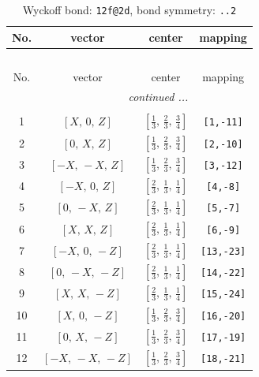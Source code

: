 \documentclass[fleqn,8pt]{jsarticle}
\begin{document}
\renewcommand{\arraystretch}{1.2}
\begin{longtable}{cccc}
\caption{Wyckoff bond: {\tt 12f@2d}, bond symmetry: {\tt ..2}}
 \\
 \hline \hline
No. & vector & center & mapping \\ \hline \endfirsthead

\multicolumn{3}{l}{\tablename\ \thetable{}} \\
 \hline \hline
No. & vector & center & mapping \\ \hline \endhead

 \hline \hline
\multicolumn{3}{r}{\footnotesize\it continued ...} \\ \endfoot

 \hline \hline
\multicolumn{3}{r}{} \\ \endlastfoot

1 & $\left[ X,\, 0,\, Z \right]$ & $\left[ \frac{1}{3},\, \frac{2}{3},\, \frac{3}{4} \right]$ & {\tt [1,-11]} \\ \hline
2 & $\left[ 0,\, X,\, Z \right]$ & $\left[ \frac{1}{3},\, \frac{2}{3},\, \frac{3}{4} \right]$ & {\tt [2,-10]} \\ \hline
3 & $\left[ - X,\, - X,\, Z \right]$ & $\left[ \frac{1}{3},\, \frac{2}{3},\, \frac{3}{4} \right]$ & {\tt [3,-12]} \\ \hline
4 & $\left[ - X,\, 0,\, Z \right]$ & $\left[ \frac{2}{3},\, \frac{1}{3},\, \frac{1}{4} \right]$ & {\tt [4,-8]} \\ \hline
5 & $\left[ 0,\, - X,\, Z \right]$ & $\left[ \frac{2}{3},\, \frac{1}{3},\, \frac{1}{4} \right]$ & {\tt [5,-7]} \\ \hline
6 & $\left[ X,\, X,\, Z \right]$ & $\left[ \frac{2}{3},\, \frac{1}{3},\, \frac{1}{4} \right]$ & {\tt [6,-9]} \\ \hline
7 & $\left[ - X,\, 0,\, - Z \right]$ & $\left[ \frac{2}{3},\, \frac{1}{3},\, \frac{1}{4} \right]$ & {\tt [13,-23]} \\ \hline
8 & $\left[ 0,\, - X,\, - Z \right]$ & $\left[ \frac{2}{3},\, \frac{1}{3},\, \frac{1}{4} \right]$ & {\tt [14,-22]} \\ \hline
9 & $\left[ X,\, X,\, - Z \right]$ & $\left[ \frac{2}{3},\, \frac{1}{3},\, \frac{1}{4} \right]$ & {\tt [15,-24]} \\ \hline
10 & $\left[ X,\, 0,\, - Z \right]$ & $\left[ \frac{1}{3},\, \frac{2}{3},\, \frac{3}{4} \right]$ & {\tt [16,-20]} \\ \hline
11 & $\left[ 0,\, X,\, - Z \right]$ & $\left[ \frac{1}{3},\, \frac{2}{3},\, \frac{3}{4} \right]$ & {\tt [17,-19]} \\ \hline
12 & $\left[ - X,\, - X,\, - Z \right]$ & $\left[ \frac{1}{3},\, \frac{2}{3},\, \frac{3}{4} \right]$ & {\tt [18,-21]} \\
\end{longtable}
\end{document}
